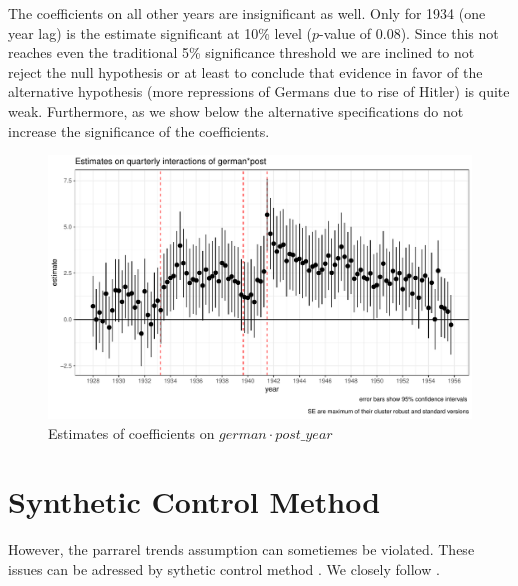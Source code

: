 The coefficients on all other years are insignificant as well. Only for 1934 (one year lag) is the estimate  significant at 10\% level ($p$-value of 0.08). Since this not reaches even the traditional 5\% significance threshold we are inclined to not reject the null hypothesis or at least to conclude that evidence in favor of the alternative hypothesis (more repressions of Germans due to rise of Hitler) is quite weak.  Furthermore, as we show below the alternative specifications do not increase the significance of the coefficients.
\begin{figure}[h]
\centering
\includegraphics[width=\textwidth]{plots/effects/quarterly/pointrange.pdf}
\caption{Estimates of coefficients on $german \cdot post\_year$}
\label{fig_did_effets}
\end{figure}

\section{Synthetic Control Method}
However, the parrarel trends assumption can sometiemes be violated. These issues can be adressed by sythetic control method
\citep{abadie_synthetic_2010, abadie_economic_2003}. We closely follow \citet{abadie_synthetic_2010}.

